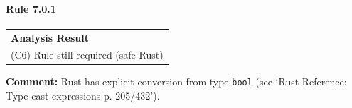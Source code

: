 \paragraph{Rule 7.0.1}
\begin{longtable}{p{13cm}}
\textbf{Analysis Result} \\
(C6) Rule still required (safe Rust) \\
\end{longtable}
\textbf{Comment:} Rust has explicit conversion from type \texttt{bool} (see `Rust Reference: Type cast expressions p. 205/432'). \\


